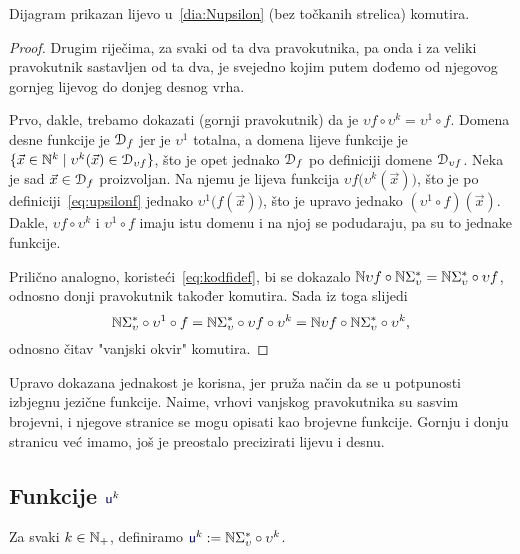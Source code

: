 \begin{lema}\label{lm:pravkomut}
Dijagram prikazan lijevo u~\eqref{dia:Nupsilon} (bez točkanih strelica) komutira.
\end{lema}
\begin{proof}
Drugim riječima, za svaki od ta dva pravokutnika, pa onda i za veliki pravokutnik sastavljen od ta dva, je svejedno kojim putem dođemo od njegovog gornjeg lijevog do donjeg desnog vrha.

Prvo, dakle, trebamo dokazati (gornji pravokutnik) da je $\upsilon f\circ\upsilon^k =\upsilon^1\circ f$. Domena desne funkcije je $\mathcal D_{f}$ jer je $\upsilon^1$ totalna, a domena lijeve funkcije je $\{\vec x\in{\mathbb N}^k\mid\upsilon^k(\vec x)\in\mathcal D_{\upsilon f}\}$, što je opet jednako $\mathcal D_{f}$ po definiciji domene $\mathcal D_{\upsilon f}$. Neka je sad $\vec x\in\mathcal D_{f}$ proizvoljan. Na njemu je lijeva funkcija $\upsilon f\bigl(\upsilon^k(\vec x)\bigr)$, što je po definiciji~\eqref{eq:upsilonf} jednako $\upsilon^1\bigl(f(\vec x)\bigr)$, što je upravo jednako $(\upsilon^1\circ f)(\vec x)$. Dakle, $\upsilon f\circ\upsilon^k$ i $\upsilon^1\circ f$ imaju istu domenu i na njoj se podudaraju, pa su to jednake funkcije.

Prilično analogno, koristeći~\eqref{eq:kodfidef}, bi se dokazalo ${\mathbb N}\upsilon f\circ{\mathbb N}\Sigma_\upsilon^*={\mathbb N}\Sigma_\upsilon^*\circ\upsilon f$, odnosno donji pravokutnik također komutira. Sada iz toga slijedi
\begin{equation}\label{eq:pravkomut}
    {\mathbb N}\Sigma_\upsilon^*\circ\upsilon^1\circ f={\mathbb N}\Sigma_\upsilon^*\circ\upsilon f\circ\upsilon^k={\mathbb N}\upsilon f\circ{\mathbb N}\Sigma_\upsilon^*\circ\upsilon^k\text,
\end{equation}
odnosno čitav "\!vanjski okvir" komutira.
\end{proof}

Upravo dokazana jednakost je korisna, jer pruža način da se u potpunosti izbjegnu jezične funkcije. Naime, vrhovi vanjskog pravokutnika su sasvim brojevni, i njegove stranice se mogu opisati kao brojevne funkcije. Gornju i donju stranicu već imamo, još je preostalo precizirati lijevu i desnu.

\subsection{Funkcije \texorpdfstring{$\f u^k$}{u}}

\begin{definicija}\label{def:uk}
Za svaki $k\in{\mathbb N}_+$, definiramo $\f u^k:=\N\Sigma_\upsilon^*\circ\upsilon^k$.
\end{definicija}

